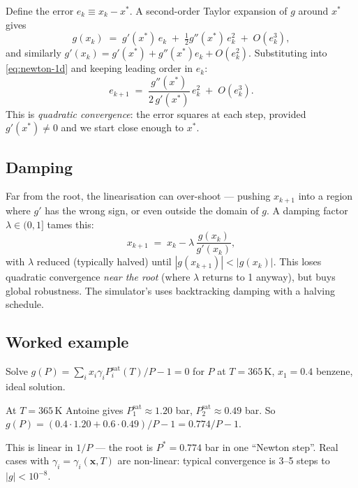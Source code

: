 \documentclass[11pt,a4paper]{article}
\newcommand{\Psat}{P^{\mathrm{sat}}}
\newcommand{\xv}{\mathbf{x}}
\begin{document}
Define the error $e_k \equiv x_k - x^*$. A second-order Taylor expansion
of $g$ around $x^*$ gives
\[
   g(x_k) \;=\; g'(x^*)\,e_k \;+\; \tfrac{1}{2} g''(x^*)\,e_k^2 \;+\; O(e_k^3),
\]
and similarly $g'(x_k) = g'(x^*) + g''(x^*) e_k + O(e_k^2)$. Substituting
into \eqref{eq:newton-1d} and keeping leading order in $e_k$:
\begin{equation}
   e_{k+1} \;=\; \frac{g''(x^*)}{2\,g'(x^*)} \, e_k^2 \;+\; O(e_k^3).
\end{equation}
This is \emph{quadratic convergence}: the error squares at each step,
provided $g'(x^*) \ne 0$ and we start close enough to $x^*$.

\subsection{Damping}

Far from the root, the linearisation can over-shoot --- pushing $x_{k+1}$
into a region where $g'$ has the wrong sign, or even outside the
domain of $g$. A damping factor $\lambda \in (0, 1]$ tames this:
\begin{equation}
   x_{k+1} \;=\; x_k - \lambda \,\frac{g(x_k)}{g'(x_k)},
\end{equation}
with $\lambda$ reduced (typically halved) until
$|g(x_{k+1})| < |g(x_k)|$. This loses quadratic convergence \emph{near
the root} (where $\lambda$ returns to 1 anyway), but buys global
robustness. The simulator's  uses backtracking
damping with a halving schedule.

\subsection{Worked example}

\begin{example}
Solve $g(P) = \sum_i x_i \gamma_i \Psat_i(T) / P - 1 = 0$ for $P$ at
$T = 365\,$K, $x_1 = 0.4$ benzene, ideal solution.

At $T = 365\,$K Antoine gives $\Psat_1 \approx 1.20$ bar,
$\Psat_2 \approx 0.49$ bar. So $g(P) = (0.4 \cdot 1.20 + 0.6 \cdot 0.49)/P - 1 = 0.774/P - 1$.

This is linear in $1/P$ --- the root is $P^* = 0.774$ bar in one
``Newton step''. Real cases with $\gamma_i = \gamma_i(\xv, T)$ are
non-linear: typical convergence is 3--5 steps to $|g| < 10^{-8}$.
\end{example}

\end{document}
